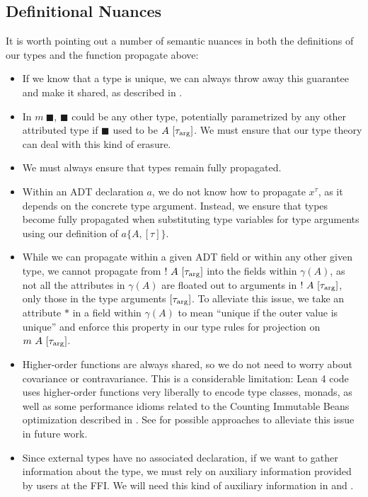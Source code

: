 \subsection{Definitional Nuances}
It is worth pointing out a number of semantic nuances in both the definitions of our types and the function propagate above:
\begin{itemize}
	\item If we know that a type is unique, we can always throw away this guarantee and make it shared, as described in .
	\item In $m\ \blacksquare$, $\blacksquare$ could be any other type, potentially parametrized by any other attributed type if $\blacksquare$ used to be $A\ [\tau_{\mathrm{arg}}]$. We must ensure that our type theory can deal with this kind of erasure.
	\item We must always ensure that types remain fully propagated.
	\item Within an ADT declaration $a$, we do not know how to propagate $x^\tau$, as it depends on the concrete type argument. Instead, we ensure that types become fully propagated when substituting type variables for type arguments using our definition of $a\{A, [\tau]\}$.
	\item While we can propagate within a given ADT field or within any other given type, we cannot propagate from $!\ A\ [\tau_\arrg]$ into the fields within $\gamma(A)$, as not all the attributes in $\gamma(A)$ are floated out to arguments in $!\ A\ [\tau_\arrg]$, only those in the type arguments $[\tau_{\mathrm{arg}}]$. To alleviate this issue, we take an attribute $*$ in a field within $\gamma(A)$ to mean ``unique if the outer value is unique'' and enforce this property in our type rules for projection on $m\ A\ [\tau_\arrg]$.
	\item Higher-order functions are always shared, so we do not need to worry about covariance or contravariance. This is a considerable limitation: Lean 4 code uses higher-order functions very liberally to encode type classes, monads, as well as some performance idioms related to the Counting Immutable Beans optimization described in . See  for possible approaches to alleviate this issue in future work.
	\item Since external types have no associated declaration, if we want to gather information about the type, we must rely on auxiliary information provided by users at the FFI. We will need this kind of auxiliary information in  and .
\end{itemize}

